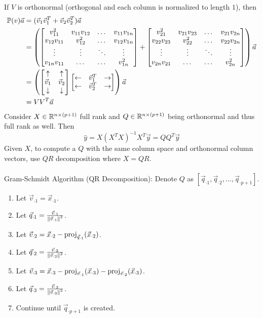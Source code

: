 \documentclass[12pt]{article}
\begin{document}
If $V$ is orthonormal (orthogonal and each column is normalized to length $1$), then $$ \begin{aligned} \mathbb{P}(v){\vec{a}} &= (\vec{v}_1\vec{v}_1^T + \vec{v}_2\vec{v}_2^T)\vec{a} \\ &= 
\left( \begin{bmatrix} v_{11}^2 & v_{11}v_{12} & \dots & v_{11}v_{1n} \\ v_{12}v_{11} & v_{12}^2 & \dots & v_{12}v_{1n} \\ 
\vdots & \vdots & \ddots & \vdots \\ v_{1n}v_{11} & \dots & \dots & v_{1n}^2 \end{bmatrix}  + \begin{bmatrix} v_{21}^2 & v_{21}v_{23} & \dots & v_{21}v_{2n} \\ v_{22}v_{23} & v_{22}^2 & \dots & v_{22}v_{2n} \\ \vdots & \vdots & \ddots & \vdots \\ v_{2n}v_{21} & \dots & \dots & v_{2n}^2 \end{bmatrix} \right) \vec{a} \\ &= \left( \begin{bmatrix} \uparrow & \uparrow \\ \vec{v}_1 & \vec{v}_2 \\ \downarrow & \downarrow \end{bmatrix} \begin{bmatrix} \leftarrow & \vec{v}_1^T & \rightarrow \\ \leftarrow & \vec{v}_2^T & \rightarrow \end{bmatrix} \right) \vec{a} \\ &= VV^T\vec{a} \end{aligned} $$ 
Consider $X \in \mathbb{R}^{ n \times (p+1) }$ full rank and $Q \in \mathbb{R}^{ n \times (p+1) }$ being orthonormal and thus full rank as well. Then 
$$\hat{y} = X(X^TX)^{-1}X^T\vec{y} = QQ^T\vec{y}$$ 
Given $X$, to compute a $Q$ with the same column space and orthonormal column vectors, use $QR$ decomposition where $X = QR$. \\~\\
Gram-Schmidt Algorithm (QR Decomposition): Denote $Q$ as $[\vec{q}_{\cdot 1}, \vec{q}_{\cdot 2},\dots, \vec{q}_{\cdot p+1}]$. 
\begin{enumerate} 
\item Let $\vec{v}_{\cdot 1} = \vec{x}_{\cdot 1}$.
\item Let $\vec{q}_{\cdot 1} = \frac{\vec{v}_{\cdot 1}}{\norm{\vec{v}_{\cdot 1}}^2}$.
\item Let $\vec{v}_{\cdot 2} = \vec{x}_{\cdot 2} - \text{proj}_{ \vec{q}_{\cdot 1} } ( \vec{x}_{\cdot 2} )$.
\item Let $\vec{q}_{\cdot 2} = \frac{\vec{v}_{\cdot 2}}{\norm{\vec{v}_{\cdot 2}}^2}$. 
\item Let $\vec{v}_{\cdot 3} = \vec{x}_{\cdot 3} - \text{proj}_{ \vec{v}_{\cdot 1} } ( \vec{x}_{\cdot 3} ) - \text{proj}_{ \vec{v}_{\cdot 2} } ( \vec{x}_{\cdot 3} )$. 
\item Let $\vec{q}_{\cdot 3} = \frac{\vec{v}_{\cdot 3}}{\norm{\vec{v}_{\cdot 3}}^2}$. 
\item Continue until $\vec{q}_{\cdot p+1}$ is created. \end{enumerate} 
\end{document}
